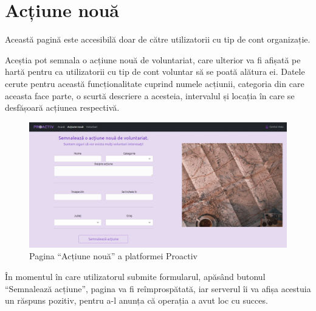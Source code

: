 \documentclass[12pt,a4paper]{report}
\begin{document}
\section{Acțiune nouă}
\par
Această pagină este accesibilă doar de către utilizatorii cu tip de cont organizație.
\\ \par
Aceștia pot semnala o acțiune nouă de voluntariat, care ulterior va fi afișată pe hartă pentru ca utilizatorii cu tip de cont voluntar să se poată alătura ei. Datele cerute pentru această funcționalitate cuprind numele acțiunii, categoria din care aceasta face parte, o scurtă descriere a acesteia, intervalul și locația în care se desfășoară acțiunea respectivă.
\\
\begin{figure}[H]
\centering
  \includegraphics[width=1\linewidth]{./imagini/actiunenoua.jpg}
  \caption{Pagina “Acțiune nouă” a platformei Proactiv}
\end{figure}
\par
În momentul în care utilizatorul submite formularul, apăsând butonul “Semnalează acțiune”, pagina va fi reîmprospătată, iar serverul îi va afișa acestuia un răspuns pozitiv, pentru a-l anunța că operația a avut loc cu succes. 
\end{document}
